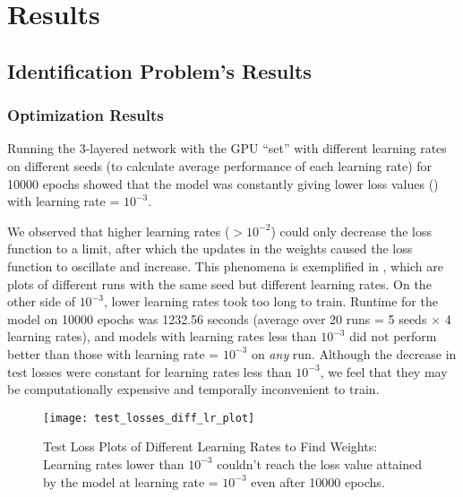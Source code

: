 \chapter{Results} \label{sec:Results}
\section{Identification Problem's Results} \label{sec:Identification Problem's Results}
\subsection{Optimization Results} \label{sec:IdProbRes - Optimization}
Running the 3-layered network with the GPU ``set'' with different learning rates on different seeds (to calculate average performance of each learning rate) for 10000 epochs showed that the model was constantly giving lower loss values () with learning rate = $10^{-3}$. 

We observed that higher learning rates ($>10^{-2}$) could only decrease the loss function to a limit, after which the updates in the weights caused the loss function to oscillate and increase. This phenomena is exemplified in , which are plots of different runs with the same seed but different learning rates. On the other side of $10^{-3}$, lower learning rates took too long to train. Runtime for the model on 10000 epochs was 1232.56 seconds (average over 20 runs = 5 seeds $\times$ 4 learning rates), and models with learning rates less than $10^{-3}$ did not perform better than those with learning rate = $10^{-3}$ on \textit{any} run. Although the decrease in test losses were constant for learning rates less than $10^{-3}$, we feel that they may be computationally expensive and temporally inconvenient to train.
\begin{figure}[!htbp]
    \centering
    \texttt{[image: test\_losses\_diff\_lr\_plot]}
    \caption[Test Loss Plots of Different Learning Rates to Find Weights]{Test Loss Plots of Different Learning Rates to Find Weights: Learning rates lower than $10^{-3}$ couldn't reach the loss value attained by the model at learning rate = $10^{-3}$ even after 10000 epochs.}
    \label{fig:Test Loss Plots of Different Learning Rates to Find Weights}
\end{figure}

